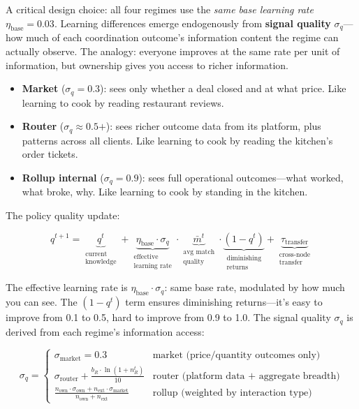 \documentclass[12pt]{article}
\theoremstyle{definition}
\begin{document}
A critical design choice: all four regimes use the \textit{same base learning rate} $\eta_{\text{base}} = 0.03$. Learning differences emerge endogenously from \textbf{signal quality} $\sigma_q$---how much of each coordination outcome's information content the regime can actually observe. The analogy: everyone improves at the same rate per unit of information, but ownership gives you access to richer information.

\begin{itemize}[leftmargin=*]
\item \textbf{Market} ($\sigma_q = 0.3$): sees only whether a deal closed and at what price. Like learning to cook by reading restaurant reviews.
\item \textbf{Router} ($\sigma_q \approx 0.5\text{+}$): sees richer outcome data from its platform, plus patterns across all clients. Like learning to cook by reading the kitchen's order tickets.
\item \textbf{Rollup internal} ($\sigma_q = 0.9$): sees full operational outcomes---what worked, what broke, why. Like learning to cook by standing in the kitchen.
\end{itemize}

\noindent The policy quality update:

\begin{equation}
\label{eq:learning}
q^{t+1} = \underbrace{q^t}_{\substack{\text{current} \\ \text{knowledge}}} + \underbrace{\eta_{\text{base}} \cdot \sigma_q}_{\substack{\text{effective} \\ \text{learning rate}}} \cdot \underbrace{\bar{m}^t}_{\substack{\text{avg match} \\ \text{quality}}} \cdot \underbrace{(1 - q^t)}_{\substack{\text{diminishing} \\ \text{returns}}} + \underbrace{\tau_{\text{transfer}}}_{\substack{\text{cross-node} \\ \text{transfer}}}
\end{equation}

\noindent The effective learning rate is $\eta_{\text{base}} \cdot \sigma_q$: same base rate, modulated by how much you can see. The $(1 - q^t)$ term ensures diminishing returns---it's easy to improve from 0.1 to 0.5, hard to improve from 0.9 to 1.0. The signal quality $\sigma_q$ is derived from each regime's information access:

\begin{equation}
\sigma_q = \begin{cases}
\sigma_{\text{market}} = 0.3 & \text{market (price/quantity outcomes only)} \\[4pt]
\sigma_{\text{router}} + \frac{b_R \cdot \ln(1 + n_R^t)}{10} & \text{router (platform data + aggregate breadth)} \\[4pt]
\frac{n_{\text{own}} \cdot \sigma_{\text{own}} + n_{\text{ext}} \cdot \sigma_{\text{market}}}{n_{\text{own}} + n_{\text{ext}}} & \text{rollup (weighted by interaction type)}
\end{cases}
\end{equation}
\end{document}
